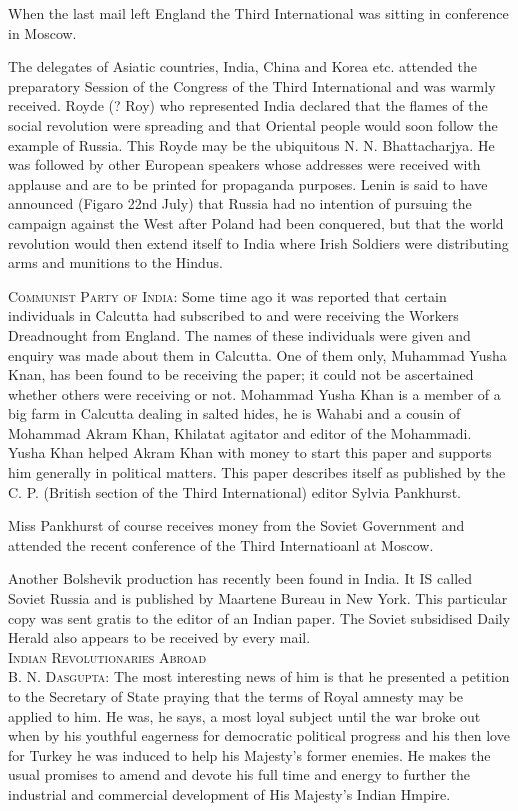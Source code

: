 When the last mail left England the Third International was sitting in conference in Moscow. 

The delegates of Asiatic countries, India, China and Korea etc. attended the preparatory Session of the Congress of the Third International and was warmly received. Royde (? Roy) 
who represented India declared that the flames of the social revolution were spreading and that Oriental people would soon follow the example of Russia. This Royde may be the ubiquitous N. N. Bhattacharjya. He was followed by other European speakers whose addresses were received with applause and are to be printed for propaganda purposes. Lenin is said to have announced (Figaro 22nd July) that Russia had no intention of pursuing the campaign against the West after Poland had been conquered, but that the world revolution would then extend itself to India where Irish Soldiers were distributing arms and munitions to the Hindus. 


\textsc{Communist Party of India:} Some time ago it was reported that certain individuals in Calcutta had subscribed to and were receiving the Workers Dreadnought from England. The names of these individuals were given and enquiry was made about them in Calcutta. One of them only, Muhammad Yusha Knan, has been found to be receiving the paper; it could not be ascertained whether others were receiving or not. Mohammad Yusha Khan is a member of a big farm in Calcutta dealing in salted hides, he is Wahabi and a cousin of Mohammad Akram Khan, Khilatat agitator and editor of the Mohammadi. Yusha Khan helped Akram Khan with money to start this paper and supports him generally in political matters. This paper describes itself as published by the C. P. (British section of the Third International) editor Sylvia Pankhurst. 

Miss Pankhurst of course receives money from the Soviet Government and attended the recent conference of the Third Internatioanl at Moscow. 

Another Bolshevik production has recently been found in India. It IS called Soviet Russia and is published by Maartene Bureau in New York. This particular copy was sent gratis to the editor of an Indian paper. The Soviet subsidised Daily Herald also appears to be received by every mail. \\


\textsc{Indian Revolutionaries Abroad}\\

\textsc{B. N. Dasgupta:} The most interesting news of him is that he presented a petition to the Secretary of State praying that the terms of Royal amnesty may be applied to him. He was,
he says, a most loyal subject until the war broke out when by his youthful eagerness for democratic political progress and his then love for Turkey he was induced to help his 
Majesty’s former enemies. He makes the usual promises to amend and devote his full time and energy to further the industrial and commercial development of His Majesty’s Indian Hmpire. 

